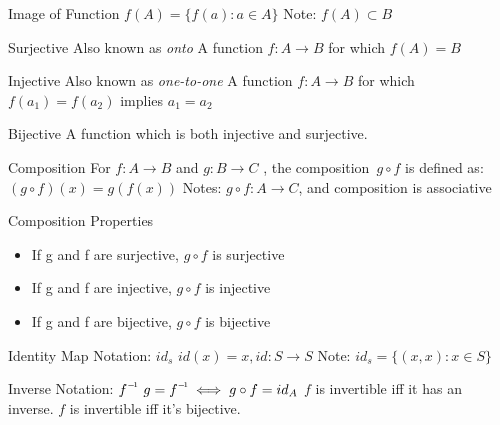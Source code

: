 \begin{flashcard}[Definition]{Image of Function}
  $f(A) = \{f(a): a \in A\}$
  \vfill
  Note: $f(A) \subset B$
\end{flashcard}

\begin{flashcard}[Definition]{Surjective}
  Also known as \emph{onto}
  \vfill
  A function $f: A \to B$ for which $f(A) = B$
\end{flashcard}

\begin{flashcard}[Definition]{Injective}
  Also known as \emph{one-to-one}
  \vfill
  A function $f: A \to B$ for which $f(a_1) = f(a_2)$ implies $a_1 = a_2$
\end{flashcard}

\begin{flashcard}[Definition]{Bijective}
  A function which is both injective and surjective.
\end{flashcard}

\begin{flashcard}[Definition]{Composition}
  For $f: A \to B$ and $g: B \to C$ , the composition~$g \circ f$ is defined as:
  \vfill
  $(g \circ f)(x) = g(f(x))$
  \vfill
  Notes: $g \circ f: A \to C$, and composition is associative
\end{flashcard}

\begin{flashcard}[Definition]{Composition Properties}
  \begin{itemize}
    \item If g and f are surjective, $g \circ f$ is surjective
    \item If g and f are injective, $g \circ f$ is injective
    \item If g and f are bijective, $g \circ f$ is bijective
  \end{itemize}
\end{flashcard}

\begin{flashcard}[Definition]{Identity Map}
  Notation: $id_s$
  \vfill
  $id(x) = x, id: S \to S$
  \vfill
  Note: $id_s = \{ (x,x): x \in S \}$
\end{flashcard}

\begin{flashcard}[Definition]{Inverse}
  Notation: $\inv{f}$
  \vfill
  $g = \inv{f} \iff g \circ f = id_A$
  \vfill
  $f$ is invertible iff it has an inverse.
  \vfill
  $f$ is invertible iff it's bijective.
\end{flashcard}
